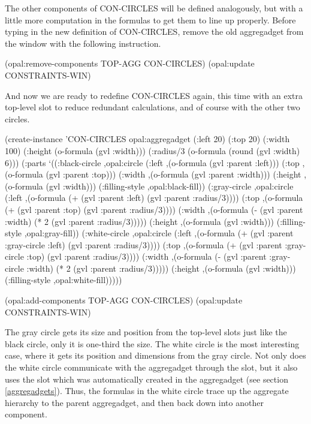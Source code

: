 The other components of CON-CIRCLES will be defined analogously, but with
a little more computation in the formulas to get them to line up properly.
Before typing in the new definition of CON-CIRCLES, remove the old
aggregadget from the window with the following instruction.

\begin{programexample}
(opal:remove-components TOP-AGG CON-CIRCLES)
(opal:update CONSTRAINTS-WIN)
\end{programexample}

And now we are ready to redefine CON-CIRCLES again, this time with an
extra top-level slot to reduce redundant calculations, and of course
with the other two circles.

\begin{programexample}
(create-instance 'CON-CIRCLES opal:aggregadget
   (:left 20) (:top 20)
   (:width 100)
   (:height (o-formula (gvl :width)))
   (:radius/3 (o-formula (round (gvl :width) 6)))
   (:parts
    `((:black-circle ,opal:circle
                     (:left ,(o-formula (gvl :parent :left)))
                     (:top ,(o-formula (gvl :parent :top)))
                     (:width ,(o-formula (gvl :parent :width)))
                     (:height ,(o-formula (gvl :width)))
                     (:filling-style ,opal:black-fill))
      (:gray-circle ,opal:circle
                    (:left ,(o-formula (+ (gvl :parent :left)
					  (gvl :parent :radius/3))))
                    (:top ,(o-formula (+ (gvl :parent :top)
					 (gvl :parent :radius/3))))
                    (:width ,(o-formula (- (gvl :parent :width)
					   (* 2 (gvl :parent :radius/3)))))
                    (:height ,(o-formula (gvl :width)))
                    (:filling-style ,opal:gray-fill))
      (:white-circle ,opal:circle
                     (:left ,(o-formula (+ (gvl :parent :gray-circle :left)
					   (gvl :parent :radius/3))))
                     (:top ,(o-formula (+ (gvl :parent :gray-circle :top)
					  (gvl :parent :radius/3))))
                     (:width ,(o-formula (- (gvl :parent :gray-circle :width)
					    (* 2 (gvl :parent :radius/3)))))
                     (:height ,(o-formula (gvl :width)))
                     (:filling-style ,opal:white-fill)))))

(opal:add-components TOP-AGG CON-CIRCLES)
(opal:update CONSTRAINTS-WIN)
\end{programexample}

The gray circle gets its size and position from the top-level slots
just like the black circle, only it is one-third the size.  The white circle
is the most interesting case, where it gets its position and
dimensions from the gray circle.  Not only does the white circle
communicate with the aggregadget through the  slot, but it
also uses the slot  which was automatically created
in the aggregadget (see section \ref{aggregadgets}).  Thus, the
formulas in the white circle trace up the aggregate hierarchy to the
parent aggregadget, and then back down into another component.

